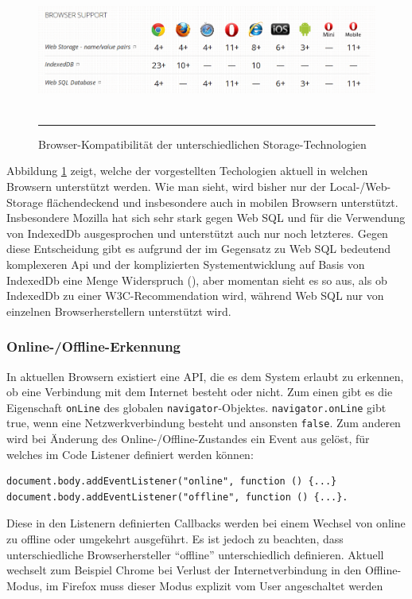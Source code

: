 \begin{figure}[h]
  \centering
  \includegraphics[width=15cm,height=4cm]{./Figures/storage_browser_compatibility.png}
    \rule{35em}{0.5pt}
  \caption[Storage Browser Kompatibilität]{Browser-Kompatibilität der unterschiedlichen Storage-Technologien}
  \label{fig:storage_browser_compatibility}
\end{figure}

Abbildung \ref{fig:storage_browser_compatibility} zeigt, welche der vorgestellten Techologien aktuell in welchen Browsern unterstützt werden. Wie man sieht, wird bisher nur der Local-/Web-Storage flächendeckend und insbesondere auch in mobilen Browsern unterstützt. Insbesondere Mozilla hat sich sehr stark gegen Web SQL und für die Verwendung von IndexedDb ausgesprochen und unterstützt auch nur noch letzteres. Gegen diese Entscheidung gibt es aufgrund der im Gegensatz zu Web SQL bedeutend komplexeren Api und der komplizierten Systementwicklung auf Basis von IndexedDb eine Menge Widerspruch (\cite{road_to_indexed_db_mozilla}), aber momentan sieht es so aus, als ob IndexedDb zu einer W3C-Recommendation wird, während Web SQL nur von einzelnen Browserherstellern unterstützt wird.

\subsubsection{Online-/Offline-Erkennung}\label{section:online_offline_erkennung}
In aktuellen Browsern existiert eine API, die es dem System erlaubt zu erkennen, ob eine Verbindung mit dem Internet besteht oder nicht. Zum einen gibt es die Eigenschaft \texttt{onLine} des globalen \texttt{navigator}-Objektes. \texttt{navigator.onLine} gibt true, wenn eine Netzwerkverbindung besteht und ansonsten \texttt{false}. Zum anderen wird bei Änderung des Online-/Offline-Zustandes ein Event aus gelöst, für welches im Code Listener definiert werden können:  

\begin{lstlisting}
document.body.addEventListener("online", function () {...} 
document.body.addEventListener("offline", function () {...}.
\end{lstlisting}
Diese in den Listenern definierten Callbacks werden bei einem Wechsel von online zu offline oder umgekehrt ausgeführt. Es ist jedoch zu beachten, dass unterschiedliche Browserhersteller "`offline"' unterschiedlich definieren. Aktuell wechselt zum Beispiel Chrome bei Verlust der Internetverbindung in den Offline-Modus, im Firefox muss dieser Modus explizit vom User angeschaltet werden \cite{mozilla_bug_offline}

